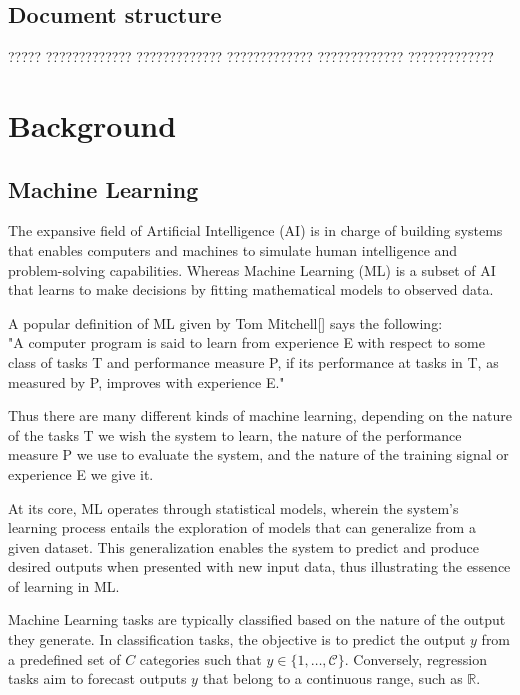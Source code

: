 \documentclass[11pt,english,listoffigures,listoftables]{tfgetsinf}
\begin{document}
\section{Document structure}

????? ????????????? ????????????? ????????????? ????????????? ????????????? 

\chapter{Background}

\section{Machine Learning}

The expansive field of Artificial Intelligence (AI) is in charge of building systems that enables computers and machines to simulate human intelligence and problem-solving capabilities. Whereas Machine Learning (ML) is a subset of AI that learns to make decisions by fitting mathematical models to observed data.

A popular definition of ML given by Tom Mitchell[] says the following:\\
"A computer program is said to learn from experience E with respect to some class of tasks T and performance measure P, if its performance at tasks in T, as measured by P, improves with experience E."

Thus there are many different kinds of machine learning, depending on the nature of the tasks T we wish the system to learn, the nature of the performance measure P we use to evaluate the system, and the nature of the training signal or experience E we give it.

At its core, ML operates through statistical models, wherein the system's learning process entails the exploration of models that can generalize from a given dataset. This generalization enables the system to predict and produce desired outputs when presented with new input data, thus illustrating the essence of learning in ML.

Machine Learning tasks are typically classified based on the nature of the output they generate. In classification tasks, the objective is to predict the output \( y \) from a predefined set of \( C \) categories such that $y \in \{1, \ldots, \mathcal{C}\}$. Conversely, regression tasks aim to forecast outputs \( y \) that belong to a continuous range, such as $\mathbb{R}$.
\end{document}
